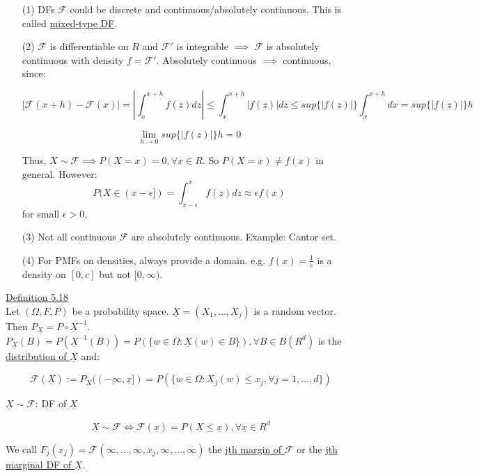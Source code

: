 \documentclass[10pt,letterpaper]{article}
\begin{document}
\begin{enumerate}

\item[(1)] DFs $\mathcal{F}$ could be discrete and continuous/absolutely continuous. This is called \underline{mixed-type DF}.

\item[(2)] $\mathcal{F}$ is differentiable on $R$ and $\mathcal{F}'$ is integrable $\implies$ $\mathcal{F}$ is absolutely continuous with density $f=\mathcal{F}'$. Absolutely continuous $\implies$ continuous, since:

$$|\mathcal{F}(x+h)-\mathcal{F}(x)|=|\int_x^{x+h}f(z)dz|\leq\int_x^{x+h}|f(z)|dz\leq sup\{|f(z)|\}\int_x^{x+h}dx=sup\{|f(z)|\}h$$

$$\lim_{h\rightarrow 0}sup\{|f(z)|\}h=0$$

Thus, $X\sim\mathcal{F}\implies P(X=x)=0,\forall x\in R$. So $P(X=x)\neq f(x)$ in general. However:
$$P(X\in (x-\epsilon])=\int_{x-\epsilon}^{x}f(z)dz\approx\epsilon f(x)$$
for small $\epsilon>0$.

\item[(3)] Not all continuous $\mathcal{F}$ are absolutely continuous. Example: Cantor set.

\item[(4)] For PMFs on densities, always provide a domain. e.g. $f(x)=\frac{1}{c}$ is a density on $[0,c]$ but not $[0,\infty)$.

\end{enumerate}

\pagebreak

\underline{Definition 5.18}\\

Let $(\Omega, F, P)$ be a probability space. $\underline{X}=(X_1, \dots, X_j)$ is a random vector. Then $P_{\underline{X}}=P\circ\underline{X}^{-1}$. $P_{\underline{X}}(B)=P(\underline{X}^{-1}(B))=P(\{w\in\Omega:\underline{X}(w)\in B\}),\forall B\in B(R^d)$ is the \underline{distribution of $\underline{X}$} and:

$$\mathcal{F}(\underline{X}):=P_{\underline{X}}((\underline{-\infty},\underline{x}])=P(\{w\in\Omega: X_j(w)\leq x_j,\forall j=1,\dots, d\})$$

$\underline{X}\sim\mathcal{F}$: DF of $\underline{X}$

$$\underline{X}\sim\mathcal{F}\iff\mathcal{F}(\underline{x})=P(\underline{X}\leq\underline{x}),\forall\underline{x}\in R^d$$

We call $F_j(x_j)=\mathcal{F}(\infty, \dots, \infty, x_j, \infty, \dots, \infty)$ the \underline{jth margin of $\mathcal{F}$} or the \underline{jth marginal DF of $\underline{X}$}.\\
\end{document}
